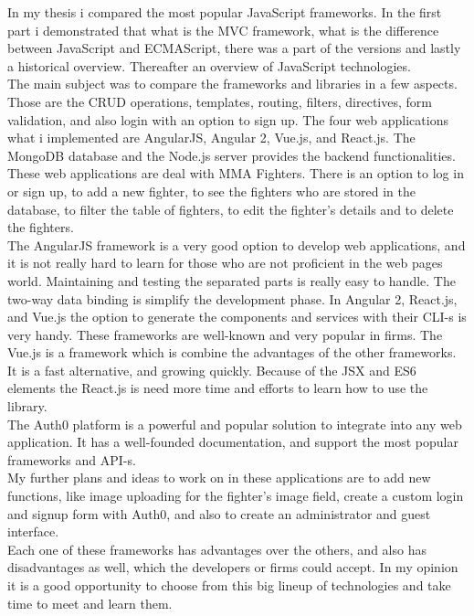 
In my thesis i compared the most popular JavaScript frameworks. In the first part i demonstrated that what is the MVC framework, what is the difference between JavaScript and ECMAScript, there was a part of the versions and lastly a historical overview. Thereafter an overview of JavaScript technologies.\\
The main subject was to compare the frameworks and libraries in a few aspects. Those are the CRUD operations, templates, routing, filters, directives, form validation, and also login with an option to sign up.
The four web applications what i implemented are AngularJS, Angular 2, Vue.js, and React.js. The MongoDB database and the Node.js server provides the backend functionalities. These web applications are deal with MMA Fighters. There is an option to log in or sign up, to add a new fighter, to see the fighters who are stored in the database, to filter the table of fighters, to edit the fighter's details and to delete the fighters.\\ The AngularJS framework is a very good option to develop web applications, and it is not really hard to learn for those who are not proficient in the web pages world. Maintaining and testing the separated parts is really easy to handle. The two-way data binding is simplify the development phase. In Angular 2, React.js, and Vue.js the option to generate the components and services with their CLI-s is very handy. These frameworks are well-known and very popular in firms. The Vue.js is a framework which is combine the advantages of the other frameworks. It is a fast alternative, and growing quickly. 
Because of the JSX and ES6 elements the React.js is need more time and efforts to learn how to use the library.\\
The Auth0 platform is a powerful and popular solution to integrate into any web application. It has a well-founded documentation, and support the most popular frameworks and API-s.\\
My further plans and ideas to work on in these applications are to add new functions, like image uploading for the fighter's image field, create a custom login and signup form with Auth0, and also to create an administrator and guest interface.\\
Each one of these frameworks has advantages over the others, and also has disadvantages as well, which the developers or firms could accept.
In my opinion it is a good opportunity to choose from this big lineup of technologies and take time to meet and learn them. 




